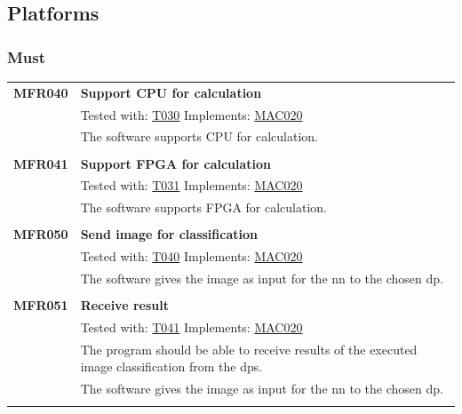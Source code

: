 \documentclass[parskip=full]{scrartcl}
\begin{document}
\newpage

\subsection{Platforms}
\subsubsection{Must}
\begin{tabular}{p{2cm}p{11.4cm}}
\textbf {MFR040}\hypertarget{MFR040} & \textbf{Support CPU for calculation} \\
& Tested with: \hyperlink{T030}{T030} Implements: \hyperlink{MAC020}{MAC020} \\
& The software supports CPU for calculation. \\
& \\
\textbf {MFR041}\hypertarget{MFR041}  & \textbf{Support FPGA for calculation} \\
& Tested with: \hyperlink{T031}{T031} Implements: \hyperlink{MAC020}{MAC020} \\
& The software supports FPGA for calculation. \\
& \\
\textbf {MFR050} \hypertarget{MFR050}& \textbf{Send image for classification} \\
& Tested with: \hyperlink{T040}{T040} Implements: \hyperlink{MAC020}{MAC020} \\
& The software gives the image as input for the \gls{nn} to the chosen \gls{dp}. \\
& \\
\textbf {MFR051} \hypertarget{MFR051}& \textbf{Receive result} \\
& Tested with: \hyperlink{T041}{T041} Implements: \hyperlink{MAC020}{MAC020} \\
& The program should be able to receive results of the executed \gls{image classification} from the \glspl{dp}. \\
& The software gives the image as input for the {nn} to the chosen \gls{dp}. \\
& \\
\end{tabular}
\end{document}
